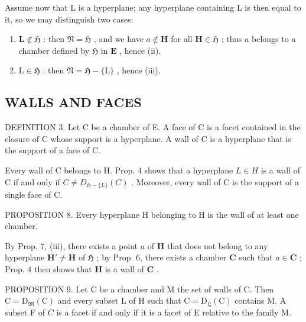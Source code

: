 Assume now that L is a hyperplane; any hyperplane containing L is then equal to it, so we may distinguish two cases:

\begin{enumerate}
\def\labelenumi{\alph{enumi})}
\item
  \(\mathbf{L} \notin \mathfrak{H}\) : then \(\mathfrak{N} = \mathfrak{H}\) , and we have \(a \notin \mathbf{H}\) for all \(\mathbf{H} \in \mathfrak{H}\) ; thus \(a\) belongs to a chamber defined by \(\mathfrak{H}\) in \(\mathbf{E}\) , hence (ii).
\item
  \(\mathrm{L} \in \mathfrak{H}\) : then \(\mathfrak{N} = \mathfrak{H} - \{\mathrm{L}\}\) , hence (iii).
\end{enumerate}

\subsection{WALLS AND FACES}

DEFINITION 3. Let C be a chamber of E. A face of C is a facet contained in the closure of C whose support is a hyperplane. A wall of C is a hyperplane that is the support of a face of C.

Every wall of C belongs to H. Prop. 4 shows that a hyperplane \(L \in H\) is a wall of C if and only if \(C \neq D_{\mathfrak{H} - \{L\}}(C)\) . Moreover, every wall of C is the support of a single face of C.

PROPOSITION 8. Every hyperplane H belonging to H is the wall of at least one chamber.

By Prop. 7, (iii), there exists a point \(a\) of \(\mathbf{H}\) that does not belong to any hyperplane \(\mathbf{H}' \neq \mathbf{H}\) of \(\mathfrak{H}\) ; by Prop. 6, there exists a chamber \(\mathbf{C}\) such that \(a \in \overline{\mathbf{C}}\) ; Prop. 4 then shows that \(\mathbf{H}\) is a wall of \(\mathbf{C}\) .

PROPOSITION 9. Let C be a chamber and M the set of walls of C. Then \(\mathrm{C} = \mathrm{D}_{\mathfrak{M}}(\mathrm{C})\) and every subset L of H such that \(\mathrm{C} = \mathrm{D}_{\mathfrak{L}}(\mathrm{C})\) contains M. A subset F of \(\overline{C}\) is a facet if and only if it is a facet of E relative to the family M.

